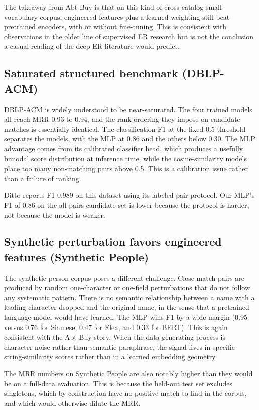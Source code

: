 \documentclass[10pt,letterpaper]{article}
\begin{document}
The takeaway from Abt-Buy is that on this kind of cross-catalog
small-vocabulary corpus, engineered features plus a learned weighting
still beat pretrained encoders, with or without fine-tuning. This is
consistent with observations in the older line of supervised ER
research \citep{bilenko2003, cohen2003} but is not the conclusion a
casual reading of the deep-ER literature would predict.

\subsection{Saturated structured benchmark (DBLP-ACM)}

DBLP-ACM is widely understood to be near-saturated. The four trained
models all reach MRR 0.93 to 0.94, and the rank ordering they impose
on candidate matches is essentially identical. The classification F1
at the fixed 0.5 threshold separates the models, with the MLP at 0.86
and the others below 0.30. The MLP advantage comes from its calibrated
classifier head, which produces a usefully bimodal score distribution
at inference time, while the cosine-similarity models place too many
non-matching pairs above 0.5. This is a calibration issue rather than
a failure of ranking.

Ditto \citep{li2020} reports F1 0.989 on this dataset using its
labeled-pair protocol. Our MLP's F1 of 0.86 on the all-pairs candidate
set is lower because the protocol is harder, not because the model is
weaker.

\subsection{Synthetic perturbation favors engineered features (Synthetic People)}

The synthetic person corpus poses a different challenge. Close-match
pairs are produced by random one-character or one-field perturbations
that do not follow any systematic pattern. There is no semantic
relationship between a name with a leading character dropped and the
original name, in the sense that a pretrained language model would
have learned. The MLP wins F1 by a wide margin (0.95 versus 0.76 for
Siamese, 0.47 for Flex, and 0.33 for BERT). This is again consistent
with the Abt-Buy story. When the data-generating process is
character-noise rather than semantic-paraphrase, the signal lives in
specific string-similarity scores rather than in a learned embedding
geometry.

The MRR numbers on Synthetic People are also notably higher than they
would be on a full-data evaluation. This is because the held-out test
set excludes singletons, which by construction have no positive match
to find in the corpus, and which would otherwise dilute the MRR.
\end{document}
